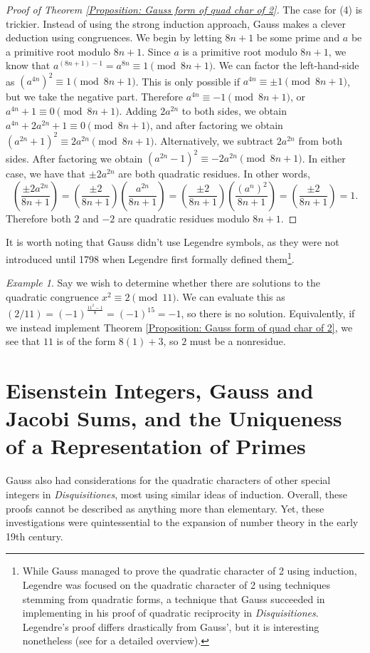 \documentclass[10pt]{amsart}
\theoremstyle{plain}
\theoremstyle{definition}
\theoremstyle{remark}
\newtheorem{ex}{Example}
\numberwithin{equation}{section}
\begin{document}
\begin{proof}[Proof of Theorem \ref{Proposition: Gauss form of quad char of 2}]
    \indent The case for (4) is trickier. Instead of using the strong induction approach, Gauss makes a clever deduction using congruences. We begin by letting $8n+1$ be some prime and $a$ be a primitive root modulo $8n+1$. Since $a$ is a primitive root modulo $8n+1$, we know that $a^{(8n+1)-1}=a^{8n}\equiv 1\pmod{8n+1}$. We can factor the left-hand-side as $(a^{4n})^{2}\equiv 1\pmod{8n+1}$. This is only possible if $a^{4n}\equiv \pm 1\pmod{8n+1}$, but we take the negative part. Therefore $a^{4n}\equiv -1\pmod{8n+1}$, or $a^{4n}+1\equiv 0\pmod{8n+1}$. Adding $2a^{2n}$ to both sides, we obtain $a^{4n}+2a^{2n}+1\equiv 0\pmod{8n+1}$, and after factoring we obtain $(a^{2n}+1)^{2}\equiv 2a^{2n}\pmod{8n+1}$. Alternatively, we subtract $2a^{2n}$ from both sides. After factoring we obtain $(a^{2n}-1)^{2}\equiv -2a^{2n}\pmod{8n+1}$. In either case, we have that $\pm 2a^{2n}$ are both quadratic residues. In other words,
    \begin{equation*}
        \left( \frac{\pm 2a^{2n}}{8n+1} \right) = \left( \frac{\pm 2}{8n+1} \right)\left( \frac{a^{2n}}{8n+1} \right) = \left( \frac{\pm 2}{8n+1} \right)\left( \frac{(a^{n})^{2}}{8n+1} \right) =  \left( \frac{\pm 2}{8n+1} \right) = 1.
    \end{equation*}
    Therefore both $2$ and $-2$ are quadratic residues modulo $8n+1$. 
\end{proof}
It is worth noting that Gauss didn't use Legendre symbols, as they were not introduced until 1798 when Legendre first formally defined them\footnote{While Gauss managed to prove the quadratic character of 2 using induction, Legendre was focused on the quadratic character of 2 using techniques stemming from quadratic forms, a technique that Gauss succeeded in implementing in his proof of quadratic reciprocity in \textit{Disquisitiones}. Legendre's proof differs drastically from Gauss', but it is interesting nonetheless (see \cite{collison1977cubbi} for a detailed overview).}. 
\begin{ex}
    Say we wish to determine whether there are solutions to the quadratic congruence $x^{2}\equiv 2\pmod{11}$. We can evaluate this as $(2/11)=(-1)^{\frac{11^{2}-1}{8}}=(-1)^{15}=-1$, so there is no solution. Equivalently, if we instead implement Theorem \ref{Proposition: Gauss form of quad char of 2}, we see that $11$ is of the form $8(1)+3$, so $2$ must be a nonresidue. 
\end{ex}

\section*{Eisenstein Integers, Gauss and Jacobi Sums, and the Uniqueness of a Representation of Primes}
Gauss also had considerations for the quadratic characters of other special integers in \textit{Disquisitiones}, most using similar ideas of induction. Overall, these proofs cannot be described as anything more than elementary. Yet, these investigations were quintessential to the expansion of number theory in the early 19th century. 
\end{document}

